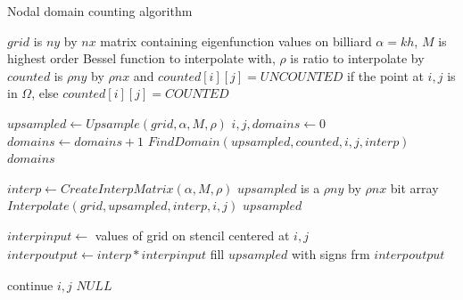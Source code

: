 \documentclass{report}
\begin{document}
\begin{algorithm}
  \caption{Nodal domain counting algorithm}
  \begin{algorithmic}
    \Require $grid$ is $ny$ by $nx$ matrix containing eigenfunction values on billiard
    \Require $\alpha = k h$, $M$ is highest order Bessel function to interpolate with, $\rho$ is ratio to interpolate by
    \Require $counted$ is $\rho ny$ by $\rho nx$ and $counted[i][j] = UNCOUNTED$ if the point at $i,j$ is in $\Omega$, else $counted[i][j] = COUNTED$
    \item[] %
        \State $upsampled \gets Upsample(grid, \alpha, M, \rho)$
        \State $i,j,domains \gets 0$
            \State $domains \gets domains + 1$
            \State $FindDomain(upsampled, counted, i, j, interp)$
        \EndWhile \\
        \Return $domains$
    \EndFunction
    
    \item[]
        \State $interp \gets CreateInterpMatrix(\alpha, M, \rho)$
        \State $upsampled$ is a $\rho ny$ by $\rho nx$ bit array
                \State $Interpolate(grid, upsampled, interp, i, j)$
            \EndFor
        \EndFor
        \State \Return $upsampled$
    \EndFunction

    \item[]
        \State $interp_{}input \gets $ values of grid on stencil centered at $i,j$
        \State $interp_{}output \gets interp * interp_{}input$
        \State fill $upsampled$ with signs frm $interp_{}output$
    \EndFunction

    \item[]
                    \State continue
                \EndIf
                    \State \Return $i,j$
                \EndIf
            \EndFor
        \EndFor
        \State \Return $NULL$
    \EndFunction
  \end{algorithmic}
\end{algorithm}
\end{document}
